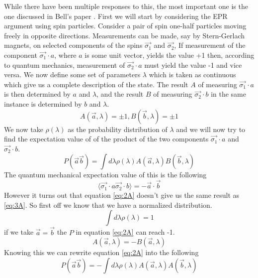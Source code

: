 While there have been multiple responses to this, the most important one is the one discussed in Bell's paper \cite{bell}.
First we will start by considering the EPR argument using spin particles. Consider a pair of spin one-half particles moving freely in opposite directions. Measurements can be made, say by Stern-Gerlach magnets, on selected components of the spins $\vec{\sigma_1}$ and $\vec{\sigma_2}$,
If measurement of the component $\vec{\sigma_1}\cdot{a}$, where $a$ is some unit vector, yields the value +1 then, according to quantum mechanics, measurement of $\vec{\sigma_2}\cdot{a}$ must yield the value -1 and vice versa.
We now define some set of parameters $\lambda$ which is taken as continuous which give us a complete description of the state. The result $A$ of measuring $\vec{\sigma_1}\cdot{a}$ is then determined by $a$ and $\lambda$, and the result $B$ of measuring $\vec{\sigma_2}\cdot{b}$ in the
same instance is determined by $b$ and $\lambda$.
\begin{equation}
\label{eq:1A} 
A(\vec{a},\lambda) = \pm 1, B(\vec{b},\lambda) = \pm 1 
\end{equation}
We now take $\rho(\lambda)$ as the probability distribution of $\lambda$ and we will now try to find the expectation value of of the product of the two components $\vec{\sigma_1}\cdot{a}$ and $\vec{\sigma_2}\cdot{b}$.
\begin{equation}
\label{eq:2A}
P(\vec{a}\vec{b}) = \int{d\lambda}\rho(\lambda)A(\vec{a},\lambda)B(\vec{b},\lambda)
\end{equation}
The quantum mechanical expectation value of this is the following
\begin{equation}
\label{eq:3A}\langle\vec{\sigma_1}\cdot{a}\vec{\sigma_2}\cdot{b}\rangle = - \vec{a}\cdot\vec{b}
\end{equation}
However it turns out that equation \ref{eq:2A} doesn't give us the same result as \ref{eq:3A}. So first off we know that we have a normalized distribution.
\begin{equation}
\label{eq:4A}
\int{d\lambda}\rho(\lambda) = 1
\end{equation}
if we take $\vec{a} = \vec{b}$ the $P$ in equation \ref{eq:2A} can reach -1.
\begin{equation}
\label{eq:5A}
A(\vec{a},\lambda) = -B(\vec{a},\lambda)
\end{equation}
Knowing this we can rewrite equation \ref{eq:2A} into the following
\begin{equation}
\label{eq:6A}
P(\vec{a}\vec{b}) = -\int{d\lambda}\rho(\lambda)A(\vec{a},\lambda)A(\vec{b},\lambda)
\end{equation}
